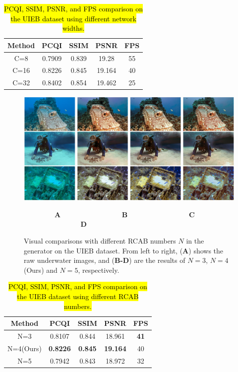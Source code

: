 \documentclass[utf8]{FrontiersinHarvard} %
\begin{document}
\begin{table}[htbp]\normalsize
\centering
\setlength\tabcolsep{13pt}
\caption{\hl{PCQI, SSIM, PSNR, and FPS comparison on the UIEB dataset using different network widths.}}
\begin{tabular}{c|cccc}
\hline  
Method&PCQI&SSIM&PSNR&FPS\\
\hline 
C=8&0.7909&0.839&19.28&55\\ 
\hline
C=16&0.8226&0.845&19.164&40\\
\hline
C=32&0.8402&0.854&19.462&25\\
\hline 
\end{tabular}
\label{tbl:ablationchannel-UIEBD}
\end{table}

\begin{figure}[htbp]
\begin{center}
\includegraphics[width=1\textwidth]{FSpiralGAN_frontiers/onepicture/abalation_RCAB300.jpg}
\end{center}
$~~~~~~~~~~~~~~~~~~~~$\textbf{A}$~~~~~~~~~~~~~~~~~~~~~~~~~~~~~~~~~~~~~~~~$\textbf{B}$~~~~~~~~~~~~~~~~~~~~~~~~~~~~~~~~~~~~~~~~$\textbf{C}$~~~~~~~~~~~~~~~~~~~~~~~~~~~~~~~~~~~~~$\textbf{D}
 \caption{Visual comparisons with different RCAB numbers $N$ in the generator on the UIEB dataset. From left to right, (\textbf{A}) shows the raw underwater images, and (\textbf{B-D}) are the results of $N=3$, $N=4$(Ours) and $N=5$, respectively. \label{fig:ablationRCAB-UIEBD}}
\end{figure}

\begin{table}[htbp]\normalsize
\centering
\setlength\tabcolsep{13pt}
\caption{\hl{PCQI, SSIM, PSNR, and FPS comparison on the UIEB dataset using different RCAB numbers.}}
\begin{tabular}{c|cccc}
\hline  
Method&PCQI&SSIM&PSNR&FPS\\
\hline 
N=3&0.8107&0.844&18.961&\textbf{41}\\ 
\hline
N=4(Ours)&\textbf{0.8226}&\textbf{0.845}&\textbf{19.164}&40\\
\hline
N=5&0.7942&0.843&18.972&32\\
\hline 
\end{tabular}
\label{tbl:ablationRCAB-UIEBD}
\end{table}
\end{document}

